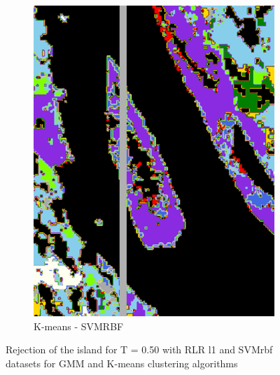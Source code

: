 \documentclass{siamart171218}
\begin{document}
\begin{figure}[h!]
\begin{subfigure}[b]{0.25\textwidth}
                \includegraphics[width=.84\linewidth]{images/Rejet_peintures_Kmeans_SVM_rbf_T0.50_Ile.png}
                \caption{K-means - SVMRBF}
                \label{fig:Kmeans_SVMrbf}
        \end{subfigure}
        \caption{Rejection of the island for T = 0.50 with RLR l1 and SVMrbf datasets for GMM and K-means clustering algorithms}\label{fig:Island}
\end{figure}
\end{document}
